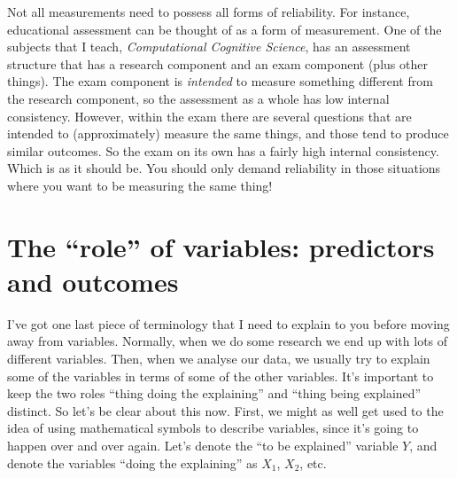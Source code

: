 \documentclass[
]{book}
\begin{document}
Not all measurements need to possess all forms of reliability. For instance, educational assessment can be thought of as a form of measurement. One of the subjects that I teach, \emph{Computational Cognitive Science}, has an assessment structure that has a research component and an exam component (plus other things). The exam component is \emph{intended} to measure something different from the research component, so the assessment as a whole has low internal consistency. However, within the exam there are several questions that are intended to (approximately) measure the same things, and those tend to produce similar outcomes. So the exam on its own has a fairly high internal consistency. Which is as it should be. You should only demand reliability in those situations where you want to be measuring the same thing!

\hypertarget{ivdv}{%
\section{The ``role'' of variables: predictors and outcomes}\label{ivdv}}

I've got one last piece of terminology that I need to explain to you before moving away from variables. Normally, when we do some research we end up with lots of different variables. Then, when we analyse our data, we usually try to explain some of the variables in terms of some of the other variables. It's important to keep the two roles ``thing doing the explaining'' and ``thing being explained'' distinct. So let's be clear about this now. First, we might as well get used to the idea of using mathematical symbols to describe variables, since it's going to happen over and over again. Let's denote the ``to be explained'' variable \(Y\), and denote the variables ``doing the explaining'' as \(X_1\), \(X_2\), etc.
\end{document}

